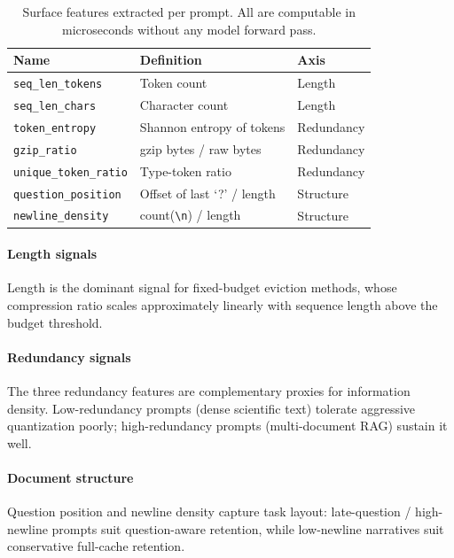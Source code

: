\documentclass[10pt, conference]{IEEEtran}
\begin{document}
\begin{table}[t]
\centering
\caption{Surface features extracted per prompt. All are computable in microseconds without any model forward pass.}
\label{tab:features}
\begin{tabular}{lll}
\toprule
\textbf{Name} & \textbf{Definition} & \textbf{Axis} \\
\midrule
\texttt{seq\_len\_tokens}     & Token count                                & Length \\
\texttt{seq\_len\_chars}      & Character count                            & Length \\
\texttt{token\_entropy}       & Shannon entropy of tokens                  & Redundancy \\
\texttt{gzip\_ratio}          & gzip bytes / raw bytes                     & Redundancy \\
\texttt{unique\_token\_ratio} & Type-token ratio                           & Redundancy \\
\texttt{question\_position}   & Offset of last `?' / length                & Structure \\
\texttt{newline\_density}     & count(\texttt{\textbackslash n}) / length  & Structure \\
\bottomrule
\end{tabular}
\end{table}

\paragraph{Length signals}
Length is the dominant signal for fixed-budget eviction methods, whose compression ratio scales approximately linearly with sequence length above the budget threshold.

\paragraph{Redundancy signals}
The three redundancy features are complementary proxies for information density. Low-redundancy prompts (dense scientific text) tolerate aggressive quantization poorly; high-redundancy prompts (multi-document RAG) sustain it well.

\paragraph{Document structure}
Question position and newline density capture task layout: late-question / high-newline prompts suit question-aware retention, while low-newline narratives suit conservative full-cache retention.
\end{document}
